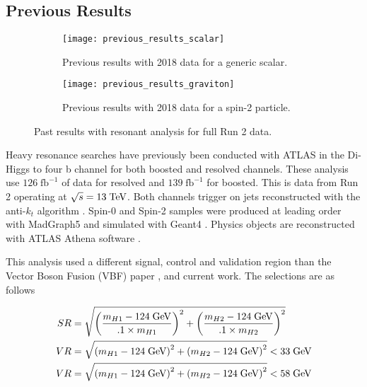 \documentclass[12pt]{article}
\begin{document}
\subsection{Previous Results}
\begin{figure}[t]
    \centering
    \begin{subfigure}[t]{.48\textwidth}
        \centering
        \texttt{[image: previous\_results\_scalar]}
        \caption{Previous results with 2018 data for a generic scalar.}
        \label{subfig:previous_results_scalar}
    \end{subfigure}
    \hfill
    \begin{subfigure}[t]{.48\textwidth}
        \centering
        \texttt{[image: previous\_results\_graviton]}
        \caption{Previous results with 2018 data for a spin-2 particle.}
        \label{subfig:previous_results_graviton}
    \end{subfigure}
\caption{Past results with resonant analysis for full Run 2 data.}
\label{fig:previous_results}
\end{figure}

Heavy resonance searches have previously been conducted with ATLAS in the Di-Higgs
to four b channel for both boosted and resolved channels. These analysis use
$126\;\text{fb}^{-1}$ of data for resolved and $139\;\text{fb}^{-1}$ for boosted.
This is data from Run 2 operating at $\sqrt{s}=13\;\text{TeV}$. Both channels
trigger on jets reconstructed with the anti-$k_t$ algorithm \cite{antikt}.
Spin-0 and Spin-2 samples were produced at leading order with MadGraph5
\cite{madgraph5_OG} and simulated with Geant4 \cite{geant4}. Physics objects are
reconstructed with ATLAS Athena software \cite{atlas_simulation}.

This analysis used a different signal, control and validation region than the
Vector Boson Fusion (VBF) paper \cite{atlas_hhbbbb_vbf}, and current work. The
selections are as follows

\begin{align} \label{eq:vbf_sr}
    SR &= \sqrt{\left( \frac{m_{H1} - 124\;\text{GeV}}{.1\times m_{H1} } \right)^2 +
    \left( \frac{m_{H2} - 124\;\text{GeV}}{.1\times m_{H2}} \right)^2} \\
    VR &= \sqrt{\left( m_{H1} - 124\;\text{GeV} \right)^2 + \left( m_{H2} -
    124\;\text{GeV} \right)^2} < 33\;\text{GeV} \\
    VR &= \sqrt{\left( m_{H1} - 124\;\text{GeV} \right)^2 + \left( m_{H2} -
    124\;\text{GeV} \right)^2} < 58\;\text{GeV}
\end{align}
\end{document}
